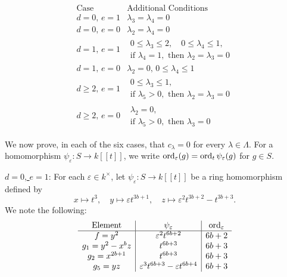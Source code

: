\[
\begin{array}{c|l}
 \text{Case}&\text{Additional Conditions} \\ \hline \hline
 d=0,\, e=1 & \lambda_3 = \lambda_4 = 0\\
 \hline
 d=0,\, e=0 & \lambda_2 = \lambda_4 = 0\\
 \hline
 d=1,\, e=1 & \begin{gathered}0\leq\lambda_3\leq2,\quad 0\leq\lambda_4\leq1,\\
                    \text{if }\lambda_4=1,\text{ then }\lambda_2=\lambda_3=0
                    \end{gathered}\\
 \hline
 d=1,\, e=0 & \lambda_2 = 0, \, 0 \le \lambda_4 \le 1\\
 \hline
 d\ge 2, \, e=1 & \begin{gathered}0\leq\lambda_3\leq1,\\
                    \text{if }\lambda_5>0,\text{ then }\lambda_2=\lambda_3=0
                    \end{gathered}\\
 \hline
 d\ge 2, \, e=0 & \begin{gathered}\lambda_2=0,\\
                    \text{if }\lambda_5>0,\text{ then }\lambda_3=0
                    \end{gathered}
\end{array}
\]


We now prove, in each of the six cases, that
$c_\lambda=0$ for every $\lambda\in\Lambda$.  For a homomorphism
$\psi_\varepsilon\colon S\to k[[t]]$, we write
$\operatorname{ord}_\varepsilon(g)=\operatorname{ord}_t\psi_\varepsilon(g)$ for $g\in S$.


\medskip

\noindent
\underline{$d=0$, $e=1$}: 
For each $\varepsilon \in k^{\times}$, let $\psi_\varepsilon : S \to k[[t]]$ be a ring homomorphism defined by
$$
x \mapsto t^3,\quad y \mapsto \varepsilon t^{3b+1}, \quad z \mapsto \varepsilon^2 t^{3b+2} - t^{3b+3}.
$$
We note the following:
\[
\begin{array}{c|c|c}
 \text{Element}&\psi_\varepsilon&\operatorname{ord}_\varepsilon\\ \hline
 f=y^2&\varepsilon^2t^{6b+2}&6b+2\\
 g_1=y^2-x^bz&t^{6b+3}&6b+3\\
 g_2=x^{2b+1}&t^{6b+3}&6b+3\\
 g_5=yz&\varepsilon^3t^{6b+3}-\varepsilon t^{6b+4}&6b+3
\end{array}
\]

